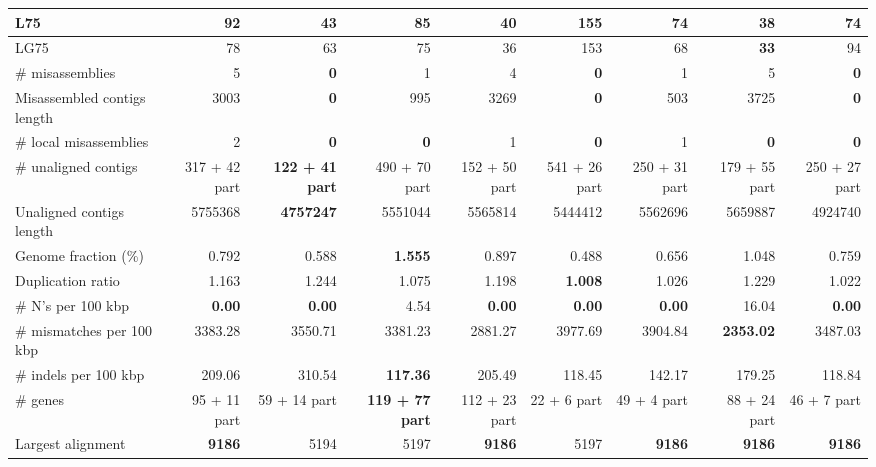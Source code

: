 \documentclass[12pt,a4paper]{article}
\begin{document}
\begin{table}[ht]
\begin{center}
\begin{tabular}{|l*{8}{|r}|}
L75 & 92 & 43 & 85 & 40 & 155 & 74 & {\bf 38} & 74 \\ \hline
LG75 & 78 & 63 & 75 & 36 & 153 & 68 & {\bf 33} & 94 \\ \hline
\# misassemblies & 5 & {\bf 0} & 1 & 4 & {\bf 0} & 1 & 5 & {\bf 0} \\ \hline
Misassembled contigs length & 3003 & {\bf 0} & 995 & 3269 & {\bf 0} & 503 & 3725 & {\bf 0} \\ \hline
\# local misassemblies & 2 & {\bf 0} & {\bf 0} & 1 & {\bf 0} & 1 & {\bf 0} & {\bf 0} \\ \hline
\# unaligned contigs & 317 + 42 part & {\bf 122 + 41 part} & 490 + 70 part & 152 + 50 part & 541 + 26 part & 250 + 31 part & 179 + 55 part & 250 + 27 part \\ \hline
Unaligned contigs length & 5755368 & {\bf 4757247} & 5551044 & 5565814 & 5444412 & 5562696 & 5659887 & 4924740 \\ \hline
Genome fraction (\%) & 0.792 & 0.588 & {\bf 1.555} & 0.897 & 0.488 & 0.656 & 1.048 & 0.759 \\ \hline
Duplication ratio & 1.163 & 1.244 & 1.075 & 1.198 & {\bf 1.008} & 1.026 & 1.229 & 1.022 \\ \hline
\# N's per 100 kbp & {\bf 0.00} & {\bf 0.00} & 4.54 & {\bf 0.00} & {\bf 0.00} & {\bf 0.00} & 16.04 & {\bf 0.00} \\ \hline
\# mismatches per 100 kbp & 3383.28 & 3550.71 & 3381.23 & 2881.27 & 3977.69 & 3904.84 & {\bf 2353.02} & 3487.03 \\ \hline
\# indels per 100 kbp & 209.06 & 310.54 & {\bf 117.36} & 205.49 & 118.45 & 142.17 & 179.25 & 118.84 \\ \hline
\# genes & 95 + 11 part & 59 + 14 part & {\bf 119 + 77 part} & 112 + 23 part & 22 + 6 part & 49 + 4 part & 88 + 24 part & 46 + 7 part \\ \hline
Largest alignment & {\bf 9186} & 5194 & 5197 & {\bf 9186} & 5197 & {\bf 9186} & {\bf 9186} & {\bf 9186} \\ \hline
\end{tabular}
\end{center}
\end{table}
\end{document}
